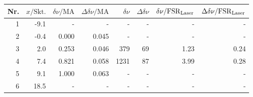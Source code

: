 \begin{tabular}{rrrrrrrr}
\toprule
Nr. & $x/\mathrm{Skt.}$ & $\delta\nu/\mathrm{MA}$ & $\Delta\delta\nu/\mathrm{MA}$ & $\delta\nu$ & $\Delta\delta\nu$ & $\delta\nu/\mathrm{FSR}_\mathrm{Laser}$ & $\Delta\delta\nu/\mathrm{FSR}_\mathrm{Laser}$ \\
\midrule
1 & -9.1 & - & - & - & - & - & - \\
2 & -0.4 & 0.000 & 0.045 & - & - & - & - \\
3 & 2.0 & 0.253 & 0.046 & 379 & 69 & 1.23 & 0.24 \\
4 & 7.4 & 0.821 & 0.058 & 1231 & 87 & 3.99 & 0.28 \\
5 & 9.1 & 1.000 & 0.063 & - & - & - & - \\
6 & 18.5 & - & - & - & - & - & - \\
\bottomrule
\end{tabular}
